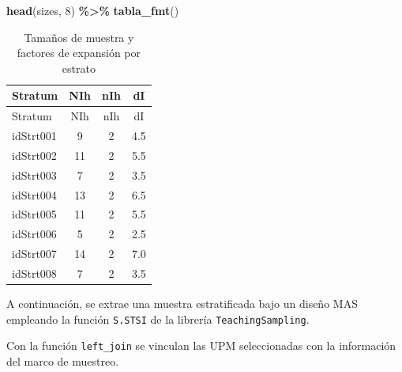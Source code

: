 \documentclass[
  spanish,
  12pt,
]{book}
\newenvironment{Shaded}{\begin{snugshade}}{\end{snugshade}}
\newcommand{\DecValTok}[1]{\textcolor[rgb]{0.00,0.00,0.81}{#1}}
\newcommand{\FunctionTok}[1]{\textcolor[rgb]{0.13,0.29,0.53}{\textbf{#1}}}
\newcommand{\NormalTok}[1]{#1}
\newcommand{\OtherTok}[1]{\textcolor[rgb]{0.56,0.35,0.01}{#1}}
\newcommand{\SpecialCharTok}[1]{\textcolor[rgb]{0.81,0.36,0.00}{\textbf{#1}}}
\begin{document}
\begin{Shaded}
\begin{Highlighting}[]
\FunctionTok{head}\NormalTok{(sizes, }\DecValTok{8}\NormalTok{) }\SpecialCharTok{\%\textgreater{}\%}
  \FunctionTok{tabla\_fmt}\NormalTok{()}
\end{Highlighting}
\end{Shaded}

\begin{longtable}[]{@{}lccc@{}}
\caption{\label{tab:tab-sizes}Tamaños de muestra y factores de expansión por estrato}\tabularnewline
\toprule\noalign{}
Stratum & NIh & nIh & dI \\
\midrule\noalign{}
\endfirsthead
\toprule\noalign{}
Stratum & NIh & nIh & dI \\
\midrule\noalign{}
\endhead
\bottomrule\noalign{}
\endlastfoot
idStrt001 & 9 & 2 & 4.5 \\
idStrt002 & 11 & 2 & 5.5 \\
idStrt003 & 7 & 2 & 3.5 \\
idStrt004 & 13 & 2 & 6.5 \\
idStrt005 & 11 & 2 & 5.5 \\
idStrt006 & 5 & 2 & 2.5 \\
idStrt007 & 14 & 2 & 7.0 \\
idStrt008 & 7 & 2 & 3.5 \\
\end{longtable}

A continuación, se extrae una muestra estratificada bajo un diseño MAS empleando la función \texttt{S.STSI} de la librería \texttt{TeachingSampling}.

\begin{Shaded}
\end{Shaded}

Con la función \texttt{left\_join} se vinculan las UPM seleccionadas con la información del marco de muestreo.

\begin{Shaded}
\end{Shaded}
\end{document}
